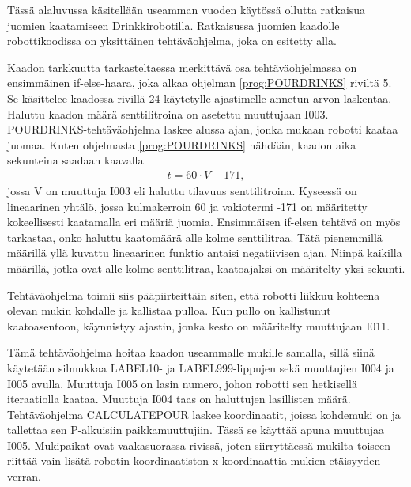 Tässä alaluvussa käsitellään useamman vuoden käytössä ollutta ratkaisua juomien kaatamiseen Drinkkirobotilla. Ratkaisussa juomien kaadolle robottikoodissa on yksittäinen tehtäväohjelma, joka on esitetty alla.

\lstset{style=Yaskawatyyli}


Kaadon tarkkuutta tarkasteltaessa merkittävä osa tehtäväohjelmassa on ensimmäinen if-else-haara, joka alkaa ohjelman \ref{prog:POURDRINKS} riviltä 5. Se käsittelee kaadossa rivillä 24 käytetylle ajastimelle annetun arvon laskentaa. Haluttu kaadon määrä senttilitroina on asetettu muuttujaan I003. POURDRINKS-tehtäväohjelma laskee alussa ajan, jonka mukaan robotti kaataa juomaa. Kuten ohjelmasta \ref{prog:POURDRINKS} nähdään, kaadon aika sekunteina saadaan kaavalla
\begin{align}
   t = 60 \cdot V - 171 \mathrm{,}
\end{align}
jossa V on muuttuja I003 eli haluttu tilavuus senttilitroina. Kyseessä on lineaarinen yhtälö, jossa kulmakerroin 60 ja vakiotermi -171 on määritetty kokeellisesti kaatamalla eri määriä juomia. Ensimmäisen if-elsen tehtävä on myös tarkastaa, onko haluttu kaatomäärä alle kolme senttilitraa. Tätä pienemmillä määrillä yllä kuvattu lineaarinen funktio antaisi negatiivisen ajan. Niinpä kaikilla määrillä, jotka ovat alle kolme senttilitraa, kaatoajaksi on määritelty yksi sekunti.

Tehtäväohjelma toimii siis pääpiirteittäin siten, että robotti liikkuu kohteena olevan mukin kohdalle ja kallistaa pulloa. Kun pullo on kallistunut kaatoasentoon, käynnistyy ajastin, jonka kesto on määritelty muuttujaan I011.

Tämä tehtäväohjelma hoitaa kaadon useammalle mukille samalla, sillä siinä käytetään silmukkaa LABEL10- ja LABEL999-lippujen sekä muuttujien I004 ja I005 avulla. Muuttuja I005 on lasin numero, johon robotti sen hetkisellä iteraatiolla kaataa. Muuttuja I004 taas on haluttujen lasillisten määrä. Tehtäväohjelma CALCULATEPOUR laskee koordinaatit, joissa kohdemuki on ja tallettaa sen P-alkuisiin paikkamuuttujiin. Tässä se käyttää apuna muuttujaa I005. Mukipaikat ovat vaakasuorassa rivissä, joten siirryttäessä mukilta toiseen riittää vain lisätä robotin koordinaatiston x-koordinaattia mukien etäisyyden verran.
